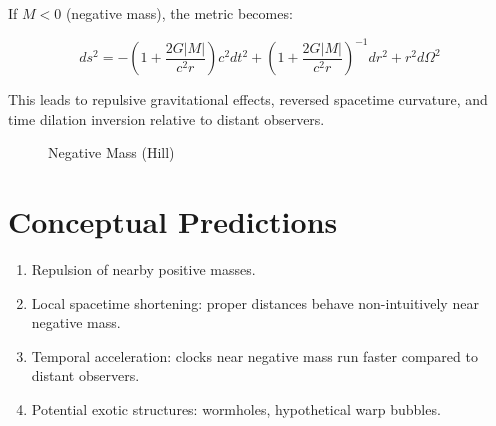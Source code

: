 \documentclass[12pt]{article}
\begin{document}
If $M < 0$ (negative mass), the metric becomes:

\begin{equation}
ds^2 = -\left(1 + \frac{2G|M|}{c^2 r}\right)c^2 dt^2 + \left(1 + \frac{2G|M|}{c^2 r}\right)^{-1} dr^2 + r^2 d\Omega^2
\end{equation}

This leads to repulsive gravitational effects, reversed spacetime curvature, and time dilation inversion relative to distant observers.

\begin{figure}[h!]
\centering
\begin{minipage}{0.45\textwidth}
\caption{Positive Mass (Dent)}
\end{minipage}
\hfill
\begin{minipage}{0.45\textwidth}
\caption{Negative Mass (Hill)}
\end{minipage}
\end{figure}

\section{Conceptual Predictions}
\begin{enumerate}
    \item Repulsion of nearby positive masses.
    \item Local spacetime shortening: proper distances behave non-intuitively near negative mass.
    \item Temporal acceleration: clocks near negative mass run faster compared to distant observers.
    \item Potential exotic structures: wormholes, hypothetical warp bubbles.
\end{enumerate}
\end{document}
